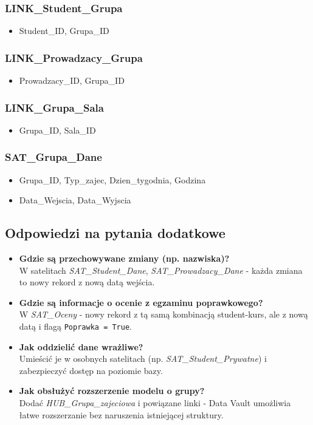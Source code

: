 \documentclass{article}
\begin{document}
\subsubsection*{LINK\_Student\_Grupa}
\begin{itemize}
  \item Student\_ID, Grupa\_ID
\end{itemize}

\subsubsection*{LINK\_Prowadzacy\_Grupa}
\begin{itemize}
  \item Prowadzacy\_ID, Grupa\_ID
\end{itemize}

\subsubsection*{LINK\_Grupa\_Sala}
\begin{itemize}
  \item Grupa\_ID, Sala\_ID
\end{itemize}

\subsubsection*{SAT\_Grupa\_Dane}
\begin{itemize}
  \item Grupa\_ID, Typ\_zajec, Dzien\_tygodnia, Godzina
  \item Data\_Wejscia, Data\_Wyjscia
\end{itemize}

\subsection{Odpowiedzi na pytania dodatkowe}

\begin{itemize}
  \item \textbf{Gdzie są przechowywane zmiany (np. nazwiska)?} \\
        W satelitach \textit{SAT\_Student\_Dane}, \textit{SAT\_Prowadzacy\_Dane} - każda zmiana to nowy rekord z nową datą wejścia.

  \item \textbf{Gdzie są informacje o ocenie z egzaminu poprawkowego?} \\
        W \textit{SAT\_Oceny} - nowy rekord z tą samą kombinacją student-kurs, ale z nową datą i flagą \texttt{Poprawka = True}.

  \item \textbf{Jak oddzielić dane wrażliwe?} \\
        Umieścić je w osobnych satelitach (np. \textit{SAT\_Student\_Prywatne}) i zabezpieczyć dostęp na poziomie bazy.

  \item \textbf{Jak obsłużyć rozszerzenie modelu o grupy?} \\
        Dodać \textit{HUB\_Grupa\_zajeciowa} i powiązane linki - Data Vault umożliwia łatwe rozszerzanie bez naruszenia istniejącej struktury.
\end{itemize}
\end{document}
